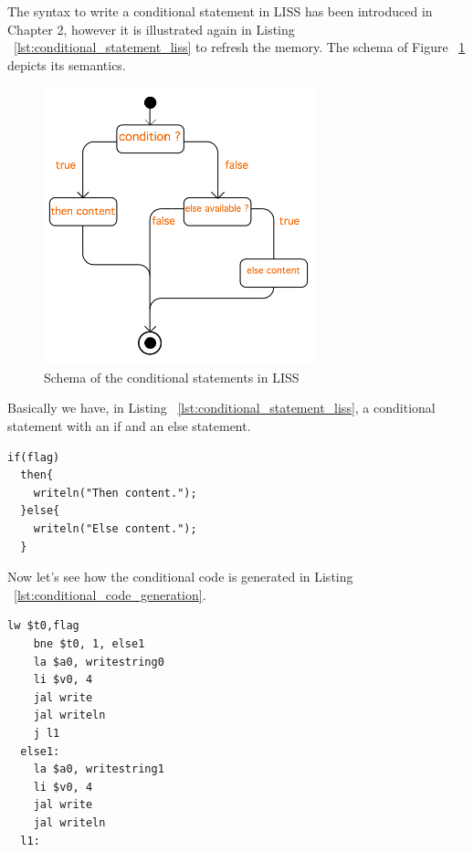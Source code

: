 \documentclass[
  oneside,
  11pt, a4paper,
  footinclude=true,
  headinclude=true,
  cleardoublepage=empty
]{scrbook}
\begin{document}
The syntax to write a conditional statement in LISS has been introduced in Chapter 2, however it is illustrated again in Listing ~\ref{lst:conditional_statement_liss} to refresh the memory. The schema of Figure ~\ref{fig:conditional_figure} depicts its semantics.

\begin{figure}[h!]
  \centering
    \includegraphics[width=0.7\textwidth]{img/conditional_statement.png}
    \caption{Schema of the conditional statements in LISS}
    \label{fig:conditional_figure}
\end{figure}

Basically we have, in Listing ~\ref{lst:conditional_statement_liss}, a conditional statement with an if and an else statement. 

\begin{lstlisting}[caption={Example of conditional statement in LISS},label={lst:conditional_statement_liss}]
  if(flag)
  then{
    writeln("Then content.");
  }else{
    writeln("Else content.");
  }
\end{lstlisting}

Now let's see how the conditional code is generated in Listing ~\ref{lst:conditional_code_generation}.

\begin{lstlisting}[caption={Code generated for conditional statement in MIPS},label={lst:conditional_code_generation}]
    lw $t0,flag		
    bne $t0, 1, else1		
    la $a0, writestring0
    li $v0, 4
    jal write		
    jal writeln		
    j l1		
  else1:		
    la $a0, writestring1
    li $v0, 4
    jal write		
    jal writeln		
  l1:		
\end{lstlisting}
\end{document}
